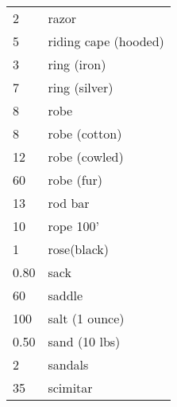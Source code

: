 \begin{normbox}[Equipment]
\begin{tabularx}{\linewidth}{@{} l X }
2 & razor\\
5 & riding cape (hooded)\\
3 & ring (iron)\\
7 & ring (silver)\\
8 & robe\\
8 & robe (cotton)\\
12 & robe (cowled)\\
60 & robe (fur)\\
13 & rod bar\\
10 & rope 100'\\
1 & rose(black)\\
0.80 & sack\\
60 & saddle\\
100 & salt (1 ounce)\\
0.50 & sand (10 lbs)\\
2 & sandals\\
35 & scimitar\\
\end{tabularx}
\end{normbox}
